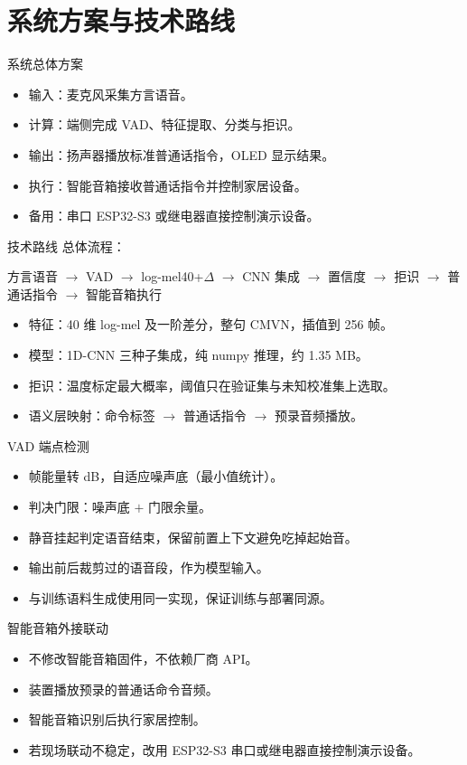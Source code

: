 \documentclass[10pt]{beamer}
\begin{document}
\section{系统方案与技术路线}
\begin{frame}{系统总体方案}
    \begin{itemize}
        \item 输入：麦克风采集方言语音。
        \item 计算：端侧完成 VAD、特征提取、分类与拒识。
        \item 输出：扬声器播放标准普通话指令，OLED 显示结果。
        \item 执行：智能音箱接收普通话指令并控制家居设备。
        \item 备用：串口 ESP32-S3 或继电器直接控制演示设备。
    \end{itemize}
\end{frame}
\begin{frame}{技术路线}
    总体流程：
    \begin{center}
        方言语音 $\rightarrow$ VAD $\rightarrow$ log-mel40+$\Delta$ $\rightarrow$ CNN 集成
        $\rightarrow$ 置信度 $\rightarrow$ 拒识 $\rightarrow$ 普通话指令 $\rightarrow$ 智能音箱执行
    \end{center}
    \begin{itemize}
        \item 特征：40 维 log-mel 及一阶差分，整句 CMVN，插值到 256 帧。
        \item 模型：1D-CNN 三种子集成，纯 numpy 推理，约 1.35 MB。
        \item 拒识：温度标定最大概率，阈值只在验证集与未知校准集上选取。
        \item 语义层映射：命令标签 $\to$ 普通话指令 $\to$ 预录音频播放。
    \end{itemize}
\end{frame}
\begin{frame}{VAD 端点检测}
    \begin{itemize}
        \item 帧能量转 dB，自适应噪声底（最小值统计）。
        \item 判决门限：噪声底 $+$ 门限余量。
        \item 静音挂起判定语音结束，保留前置上下文避免吃掉起始音。
        \item 输出前后裁剪过的语音段，作为模型输入。
        \item 与训练语料生成使用同一实现，保证训练与部署同源。
    \end{itemize}
\end{frame}
\begin{frame}{智能音箱外接联动}
    \begin{itemize}
        \item 不修改智能音箱固件，不依赖厂商 API。
        \item 装置播放预录的普通话命令音频。
        \item 智能音箱识别后执行家居控制。
        \item 若现场联动不稳定，改用 ESP32-S3 串口或继电器直接控制演示设备。
    \end{itemize}
\end{frame}
\end{document}

